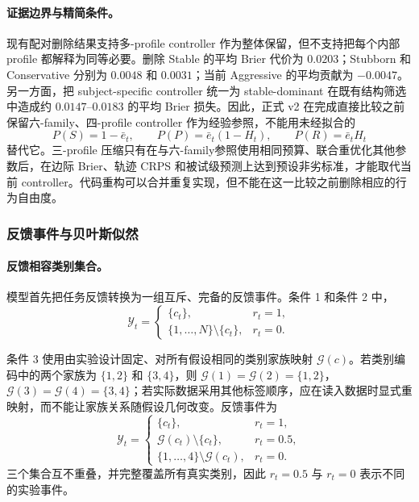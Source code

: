 \paragraph{证据边界与精简条件。}
现有配对删除结果支持多-profile controller 作为整体保留，但不支持把每个内部 profile 都解释为同等必要。删除 Stable 的平均 Brier 代价为 $0.0203$；Stubborn 和 Conservative 分别为 $0.0048$ 和 $0.0031$；当前 Aggressive 的平均贡献为 $-0.0047$。另一方面，把 subject-specific controller 统一为 stable-dominant 在既有结构筛选中造成约 $0.0147$--$0.0183$ 的平均 Brier 损失。因此，正式 v2 在完成直接比较之前保留六-family、四-profile controller 作为经验参照，不能用未经拟合的
\[
    P(S)=1-\bar e_t,\qquad
    P(P)=\bar e_t(1-H_t),\qquad
    P(R)=\bar e_tH_t
\]
替代它。三-profile 压缩只有在与六-family参照使用相同预算、联合重优化其他参数后，在边际 Brier、轨迹 CRPS 和被试级预测上达到预设非劣标准，才能取代当前 controller。代码重构可以合并重复实现，但不能在这一比较之前删除相应的行为自由度。


\subsubsection{反馈事件与贝叶斯似然}

\paragraph{反馈相容类别集合。}
模型首先把任务反馈转换为一组互斥、完备的反馈事件。条件 1 和条件 2 中，
\begin{equation}
    \mathcal Y_t
    =
    \begin{cases}
        \{c_t\},&r_t=1,\\
        \{1,\ldots,N\}\setminus\{c_t\},&r_t=0.
    \end{cases}
    \label{eq:modelv2-feedback-set-cond12}
\end{equation}

条件 3 使用由实验设计固定、对所有假设相同的类别家族映射 $\mathcal G(c)$。若类别编码中的两个家族为 $\{1,2\}$ 和 $\{3,4\}$，则 $\mathcal G(1)=\mathcal G(2)=\{1,2\}$，$\mathcal G(3)=\mathcal G(4)=\{3,4\}$；若实际数据采用其他标签顺序，应在读入数据时显式重映射，而不能让家族关系随假设几何改变。反馈事件为
\begin{equation}
    \mathcal Y_t
    =
    \begin{cases}
        \{c_t\},&r_t=1,\\
        \mathcal G(c_t)\setminus\{c_t\},&r_t=0.5,\\
        \{1,\ldots,4\}\setminus\mathcal G(c_t),&r_t=0.
    \end{cases}
    \label{eq:modelv2-feedback-set-cond3}
\end{equation}
三个集合互不重叠，并完整覆盖所有真实类别，因此 $r_t=0.5$ 与 $r_t=0$ 表示不同的实验事件。

